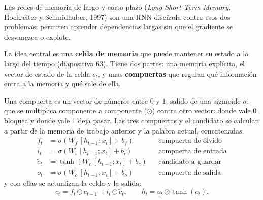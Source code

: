 \documentclass[11pt,letterpaper]{article}
\begin{document}
Las redes de memoria de largo y corto plazo (\textit{Long Short-Term
Memory}, Hochreiter y Schmidhuber, 1997) son una RNN diseñada contra
esos dos problemas: permiten aprender dependencias largas sin que el
gradiente se desvanezca o explote.

\begin{idea}
    La idea central es una \textbf{celda de memoria} que puede mantener
    su estado a lo largo del tiempo (diapositiva $63$). Tiene dos
    partes: una memoria explícita, el vector de estado de la celda
    $c_t$, y unas \textbf{compuertas} que regulan qué información
    entra a la memoria y qué sale de ella.
\end{idea}

Una compuerta es un vector de números entre $0$ y $1$, salido de una
sigmoide $\sigma$, que se multiplica componente a componente ($\odot$)
contra otro vector: donde vale $0$ bloquea y donde vale $1$ deja pasar.
Las tres compuertas y el candidato se calculan a partir de la memoria
de trabajo anterior y la palabra actual, concatenadas:
\begin{align*}
    f_t &= \sigma\!\left(W_f\, [h_{t-1}; x_t] + b_f\right)
        & &\text{compuerta de olvido} \\
    i_t &= \sigma\!\left(W_i\, [h_{t-1}; x_t] + b_i\right)
        & &\text{compuerta de entrada} \\
    \tilde{c}_t &= \tanh\!\left(W_c\, [h_{t-1}; x_t] + b_c\right)
        & &\text{candidato a guardar} \\
    o_t &= \sigma\!\left(W_o\, [h_{t-1}; x_t] + b_o\right)
        & &\text{compuerta de salida}
\end{align*}
y con ellas se actualizan la celda y la salida:
\[
    c_t = f_t \odot c_{t-1} + i_t \odot \tilde{c}_t ,
    \qquad
    h_t = o_t \odot \tanh(c_t) .
\]
\end{document}
